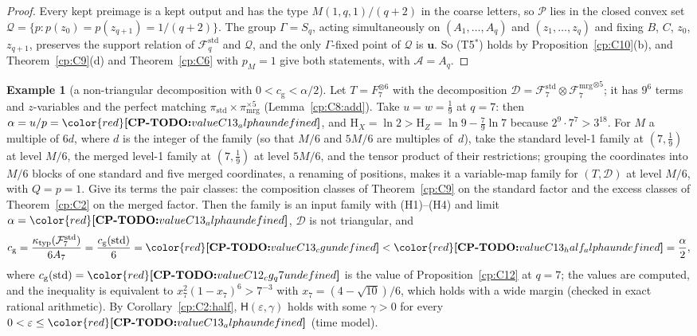 \documentclass[11pt]{article}
\makeatletter
\theoremstyle{definition}
\newtheorem{example}[theorem]{Example}  %
\theoremstyle{remark}
\DeclareRobustCommand{\CPTODO}[1]{{\color{red}\textbf{[CP-TODO:} #1\textbf{]}}}
\providecommand{\eps}{\varepsilon}
\newcommand{\Ent}{\mathrm{H}}                 %
\newcommand{\Hyp}{\mathsf{H}}                 %
\newcommand{\cg}{c_{\mathrm g}}               %
\newcommand{\Hcond}[1]{\textup{(H#1)}}        %
\newcommand{\Tcond}[1]{\textup{(T#1)}}        %
\newcommand{\Fstd}{\mathcal{F}^{\mathrm{std}}_q} %
\newcommand{\Fstdq}[1]{\mathcal{F}^{\mathrm{std}}_{#1}} %
\newcommand{\Fmrgq}[1]{\mathcal{F}^{\mathrm{mrg}}_{#1}} %
\newcommand{\Acs}{\mathcal A}                %
\newcommand{\ktyp}{\kappa_{\mathrm{typ}}}    %
\newcommand{\unif}{\mathbf u}                %
\newcommand{\cpv}[1]{\ifcsname cpv@#1\endcsname\csname cpv@#1\endcsname\else\CPTODO{value #1 undefined}\fi}
\makeatother
\begin{document}
\begin{proof}
Every kept preimage is a kept output and has the type $M(1,q,1)/(q+2)$ in the coarse letters, so $\mathcal P$ lies in the closed convex set $\mathcal Q=\{p:p(z_0)=p(z_{q+1})=1/(q+2)\}$. The group $\Gamma=S_q$, acting simultaneously on $(A_1,\dots,A_q)$ and $(z_1,\dots,z_q)$ and fixing $B$, $C$, $z_0$, $z_{q+1}$, preserves the support relation of $\Fstd$ and $\mathcal Q$, and the only $\Gamma$-fixed point of $\mathcal Q$ is $\unif$. So \Tcond{5$^*$} holds by Proposition~\ref{cp:C10}(b), and Theorem~\ref{cp:C9}(d) and Theorem~\ref{cp:C6} with $p_M=1$ give both statements, with $\Acs=A_q$.
\end{proof}

\begin{example}[a non-triangular decomposition with $0<\cg<\alpha/2$]\label{cp:C13}
Let $T=F_7^{\otimes6}$ with the decomposition $\mathcal D=\Fstdq{7}\otimes{\Fmrgq{7}}^{\otimes5}$; it has $9^6$ terms and $z$-variables and the perfect matching $\pi_{\mathrm{std}}\times\pi_{\mathrm{mrg}}^{\times5}$ (Lemma~\ref{cp:C8:add}). Take $u=w=\frac19$ at $q=7$: then $\alpha=u/p=\cpv{C13_alpha}$, and $\Ent_X=\ln2>\Ent_Z=\ln9-\frac79\ln7$ because $2^9\cdot7^7>3^{18}$. For $M$ a multiple of $6d$, where $d$ is the integer of the family (so that $M/6$ and $5M/6$ are multiples of~$d$), take the standard level-1 family at $(7,\frac19)$ at level $M/6$, the merged level-1 family at $(7,\frac19)$ at level $5M/6$, and the tensor product of their restrictions; grouping the coordinates into $M/6$ blocks of one standard and five merged coordinates, a renaming of positions, makes it a variable-map family for $(T,\mathcal D)$ at level $M/6$, with $Q=p=1$. Give its terms the pair classes: the composition classes of Theorem~\ref{cp:C9} on the standard factor and the excess classes of Theorem~\ref{cp:C2} on the merged factor. Then the family is an input family with \Hcond1--\Hcond4{} and limit $\alpha=\cpv{C13_alpha}$, $\mathcal D$ is not triangular, and
\[
\cg=\frac{\ktyp(\Fstdq{7})}{6A_7}=\frac{\cg(\text{std})}6=\cpv{C13_cg}<\cpv{C13_half_alpha}=\frac\alpha2,
\]
where $\cg(\text{std})=\cpv{C12_cg_q7}$ is the value of Proposition~\ref{cp:C12} at $q=7$; the values are computed, and the inequality is equivalent to $x_7^2(1-x_7)^6>7^{-3}$ with $x_7=(4-\sqrt{10})/6$, which holds with a wide margin (checked in exact rational arithmetic). By Corollary~\ref{cp:C2:half}, $\Hyp(\eps,\gamma)$ holds with some $\gamma>0$ for every $0<\eps\le\cpv{C13_alpha}$ (time model).
\end{example}
\end{document}
